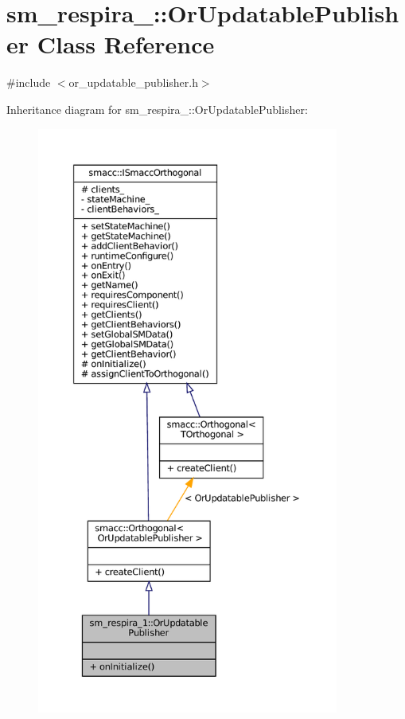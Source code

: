 \hypertarget{classsm__respira__1_1_1OrUpdatablePublisher}{}\section{sm\+\_\+respira\+\_\+:\+:Or\+Updatable\+Publisher Class Reference}
\label{classsm__respira__1_1_1OrUpdatablePublisher}


{\ttfamily \#include $<$or\+\_\+updatable\+\_\+publisher.\+h$>$}



Inheritance diagram for sm\+\_\+respira\+\_\+:\+:Or\+Updatable\+Publisher\+:
\nopagebreak
\begin{figure}[H]
\begin{center}
\leavevmode
\includegraphics[height=550pt]{classsm__respira__1_1_1OrUpdatablePublisher__inherit__graph}
\end{center}
\end{figure}


